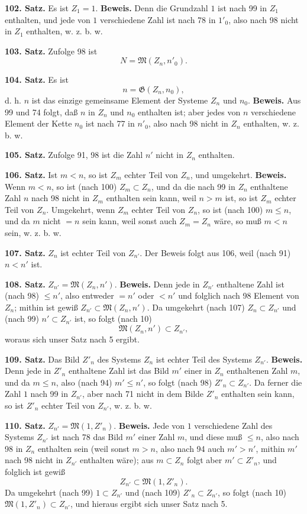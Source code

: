 \documentclass[11pt]{article}
\newcommand{\Mf}{\mathfrak{M}}
\newcommand{\Gf}{\mathfrak{G}}
\newcommand{\partof}{\mathrel{\subset}}
\begin{document}
\noindent\textbf{102. Satz.} Es ist $Z_1=1$. \textbf{Beweis.} Denn die Grundzahl $1$ ist nach 99 in $Z_1$ enthalten, und jede von $1$ verschiedene Zahl ist nach 78 in $1'_0$, also nach 98 nicht in $Z_1$ enthalten, w. z. b. w.

\noindent\textbf{103. Satz.} Zufolge 98 ist
\[
N=\Mf(Z_n,n'_0).
\]

\noindent\textbf{104. Satz.} Es ist
\[
n=\Gf(Z_n,n_0),
\]
d. h. $n$ ist das einzige gemeinsame Element der Systeme $Z_n$ und $n_0$. \textbf{Beweis.} Aus 99 und 74 folgt, daß $n$ in $Z_n$ und $n_0$ enthalten ist; aber jedes von $n$ verschiedene Element der Kette $n_0$ ist nach 77 in $n'_0$, also nach 98 nicht in $Z_n$ enthalten, w. z. b. w.

\noindent\textbf{105. Satz.} Zufolge 91, 98 ist die Zahl $n'$ nicht in $Z_n$ enthalten.

\noindent\textbf{106. Satz.} Ist $m<n$, so ist $Z_m$ echter Teil von $Z_n$, und umgekehrt. \textbf{Beweis.} Wenn $m<n$, so ist (nach 100) $Z_m\partof Z_n$, und da die nach 99 in $Z_n$ enthaltene Zahl $n$ nach 98 nicht in $Z_m$ enthalten sein kann, weil $n>m$ ist, so ist $Z_m$ echter Teil von $Z_n$. Umgekehrt, wenn $Z_m$ echter Teil von $Z_n$, so ist (nach 100) $m\le n$, und da $m$ nicht $=n$ sein kann, weil sonst auch $Z_m=Z_n$ wäre, so muß $m<n$ sein, w. z. b. w.

\noindent\textbf{107. Satz.} $Z_n$ ist echter Teil von $Z_{n'}$. Der Beweis folgt aus 106, weil (nach 91) $n<n'$ ist.

\noindent\textbf{108. Satz.} $Z_{n'}=\Mf(Z_n,n')$. \textbf{Beweis.} Denn jede in $Z_{n'}$ enthaltene Zahl ist (nach 98) $\le n'$, also entweder $=n'$ oder $<n'$ und folglich nach 98 Element von $Z_n$; mithin ist gewiß $Z_{n'}\partof\Mf(Z_n,n')$. Da umgekehrt (nach 107) $Z_n\partof Z_{n'}$ und (nach 99) $n'\partof Z_{n'}$ ist, so folgt (nach 10)
\[
\Mf(Z_n,n')\partof Z_{n'},
\]
woraus sich unser Satz nach 5 ergibt.

\noindent\textbf{109. Satz.} Das Bild $Z'_n$ des Systems $Z_n$ ist echter Teil des Systems $Z_{n'}$. \textbf{Beweis.} Denn jede in $Z'_n$ enthaltene Zahl ist das Bild $m'$ einer in $Z_n$ enthaltenen Zahl $m$, und da $m\le n$, also (nach 94) $m'\le n'$, so folgt (nach 98) $Z'_n\partof Z_{n'}$. Da ferner die Zahl $1$ nach 99 in $Z_{n'}$, aber nach 71 nicht in dem Bilde $Z'_n$ enthalten sein kann, so ist $Z'_n$ echter Teil von $Z_{n'}$, w. z. b. w.

\noindent\textbf{110. Satz.} $Z_{n'}=\Mf(1,Z'_n)$. \textbf{Beweis.} Jede von $1$ verschiedene Zahl des Systems $Z_{n'}$ ist nach 78 das Bild $m'$ einer Zahl $m$, und diese muß $\le n$, also nach 98 in $Z_n$ enthalten sein (weil sonst $m>n$, also nach 94 auch $m'>n'$, mithin $m'$ nach 98 nicht in $Z_{n'}$ enthalten wäre); aus $m\partof Z_n$ folgt aber $m'\partof Z'_n$, und folglich ist gewiß
\[
Z_{n'}\partof\Mf(1,Z'_n).
\]
Da umgekehrt (nach 99) $1\partof Z_{n'}$ und (nach 109) $Z'_n\partof Z_{n'}$, so folgt (nach 10) $\Mf(1,Z'_n)\partof Z_{n'}$, und hieraus ergibt sich unser Satz nach 5.
\end{document}
